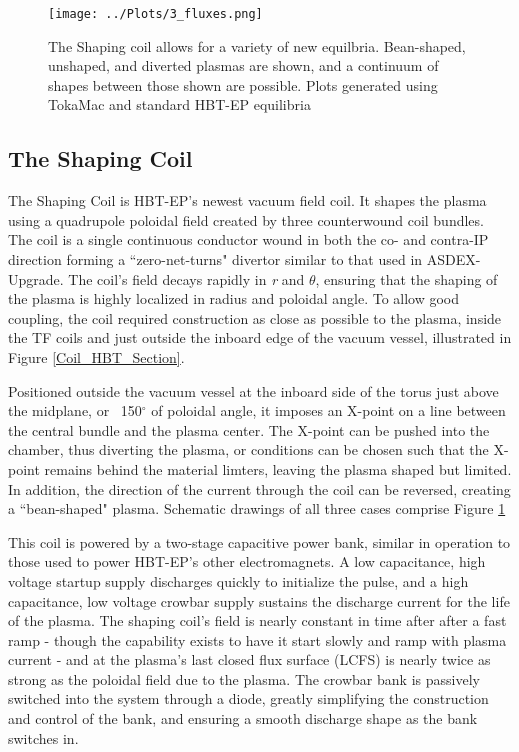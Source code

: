 \documentclass[aps,preprint,showpacs,superscriptaddress,groupedaddress]{revtex4}  %
\begin{document}
\begin{figure}[htb]
	\centering
\texttt{[image: ../Plots/3\_fluxes.png]}
	\caption{The Shaping coil allows for a variety of new equilbria.  Bean-shaped, unshaped, and diverted plasmas are shown, and a continuum of shapes between those shown are possible.  Plots generated using TokaMac and standard HBT-EP equilibria}
	\label{3_shapes}
	\end{figure}	

\subsection{The Shaping Coil}
    The Shaping Coil is HBT-EP's newest vacuum field coil.  It shapes the plasma using a quadrupole poloidal field created by three counterwound coil bundles.  The coil is a single continuous conductor wound in both the co- and contra-IP direction forming a ``zero-net-turns" divertor similar to that used in ASDEX-Upgrade\cite{Keilhacker}.  The coil's field decays rapidly in \textit{r} and \textit{$\theta$}, ensuring that the shaping of the plasma is highly localized in radius and poloidal angle.  To allow good coupling, the coil required construction as close as possible to the plasma, inside the TF coils and just outside the inboard edge of the vacuum vessel, illustrated in Figure \ref{Coil_HBT_Section}.\par
    Positioned outside the vacuum vessel at the inboard side of the torus just above the midplane, or ~150$^{\circ}$ of poloidal angle, it imposes an X-point on a line between the central bundle and the plasma center.  The X-point can be pushed into the chamber, thus diverting the plasma, or conditions can be chosen such that the X-point remains behind the material limters, leaving the plasma shaped but limited.  In addition, the direction of the current through the coil can be reversed, creating a ``bean-shaped" plasma.  Schematic drawings of all three cases comprise Figure \ref{3_shapes}\par
    
This coil is powered by a two-stage capacitive power bank, similar in operation to those used to power HBT-EP's other electromagnets\cite{Gates}. A low capacitance, high voltage startup supply discharges quickly to initialize the pulse, and a high capacitance, low voltage crowbar supply sustains the discharge current for the life of the plasma.  The shaping coil's field is nearly constant in time after after a fast ramp - though the capability exists to have it start slowly and ramp with plasma current - and at the plasma's last closed flux surface (LCFS) is nearly twice as strong as the poloidal field due to the plasma.  The crowbar bank is passively switched into the system through a diode, greatly simplifying the construction and control of the bank, and ensuring a smooth discharge shape as the bank switches in.
\end{document}
